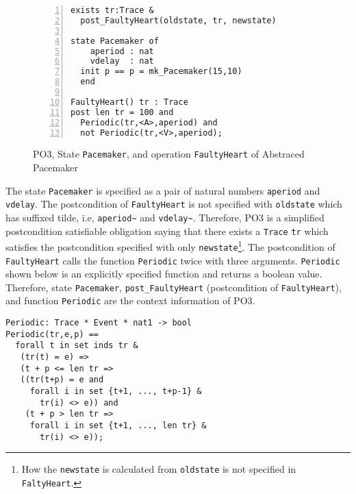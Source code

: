 \begin{figure}[t]
\begin{center}
\begin{mdframed}[roundcorner=5pt]
\begin{Verbatim}[fontsize=\small,numbers=left]
exists tr:Trace &
  post_FaultyHeart(oldstate, tr, newstate)

state Pacemaker of
    aperiod : nat 
    vdelay  : nat
  init p == p = mk_Pacemaker(15,10)
  end

FaultyHeart() tr : Trace
post len tr = 100 and
  Periodic(tr,<A>,aperiod) and 
  not Periodic(tr,<V>,aperiod);
\end{Verbatim}
\end{mdframed}
\vspace{-10pt}
\caption{PO3, State {\tt Pacemaker}, and operation {\tt FaultyHeart} of Abstraced Pacemaker}
\label{fig:po3_case1}
\end{center}
\vspace{-20pt}
\end{figure}

The state {\tt Pacemaker} is specified as a pair of natural numbers {\tt aperiod} and {\tt vdelay}. The postcondition of {\tt FaultyHeart} is not specified with {\tt oldstate} which has suffixed tilde, i.e, {\tt aperiod\textasciitilde} and {\tt vdelay\textasciitilde}. Therefore, PO3 is a simplified postcondition satisfiable obligation saying that there exists a {\tt Trace} {\tt tr} which satisfies the postcondition specified with only {\tt newstate}\footnote{How the {\tt newstate} is calculated from {\tt oldstate} is not specified in {\tt FaltyHeart}.}. The postcondition of {\tt FaultyHeart} calls the function {\tt Periodic} twice with three arguments. {\tt Periodic} shown below is an explicitly specified function and returns a boolean value. Therefore, state {\tt Pacemaker}, {\tt post\_FaultyHeart} (postcondition of {\tt FaultyHeart}), and function {\tt Periodic} are the context information of PO3. 

\begin{mdframed}[roundcorner=5pt]
\begin{Verbatim}[fontsize=\small]
Periodic: Trace * Event * nat1 -> bool
Periodic(tr,e,p) ==
  forall t in set inds tr &
   (tr(t) = e) =>
   (t + p <= len tr =>
   ((tr(t+p) = e and
     forall i in set {t+1, ..., t+p-1} &
       tr(i) <> e)) and
    (t + p > len tr =>
     forall i in set {t+1, ..., len tr} &
       tr(i) <> e));
\end{Verbatim}
\end{mdframed}

